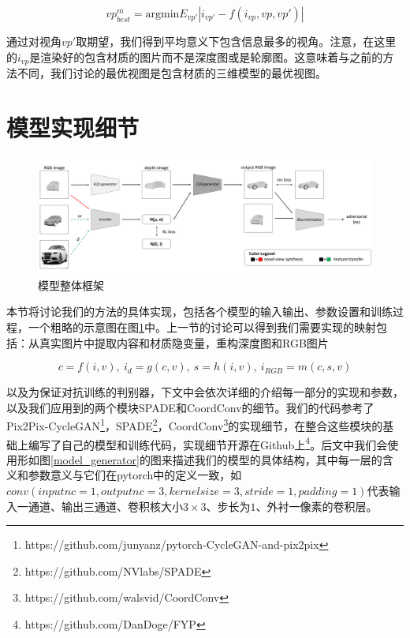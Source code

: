 \documentclass[UTF8,openany,AutoFakeBold,AutoFakeSlant,cs4size]{ctexbook}
\begin{document}
\begin{equation}
	vp_{best}^{m} = \mbox{argmin} E_{vp'} | i_{vp'} - f(i_{vp}, vp, vp')|
\end{equation}


通过对视角$vp'$取期望，我们得到平均意义下包含信息最多的视角。注意，在这里的$i_{vp}$是渲染好的包含材质的图片而不是深度图或是轮廓图。这意味着与之前的方法不同，我们讨论的最优视图是包含材质的三维模型的最优视图。

\section{模型实现细节}

\begin{figure}
\centering
\includegraphics[width=\linewidth]{./images/banner.png}
\caption{模型整体框架}
\label{model_architecture}
\end{figure}

本节将讨论我们的方法的具体实现，包括各个模型的输入输出、参数设置和训练过程，一个粗略的示意图在图\ref{model_architecture}中。上一节的讨论可以得到我们需要实现的映射包括：从真实图片中提取内容和材质隐变量，重构深度图和RGB图片

\begin{equation}
	c = f(i, v),\ i_d = g(c, v),\ s = h(i ,v),\ i_{RGB} = m(c, s, v)
\end{equation}

以及为保证对抗训练的判别器，下文中会依次详细的介绍每一部分的实现和参数，以及我们应用到的两个模块SPADE\cite{park2019SPADE}和CoordConv\cite{NIPS2018_8169}的细节。我们的代码参考了Pix2Pix-CycleGAN\footnote{https://github.com/junyanz/pytorch-CycleGAN-and-pix2pix}，SPADE\footnote{https://github.com/NVlabs/SPADE}，CoordConv\footnote{https://github.com/walsvid/CoordConv}的实现细节，在整合这些模块的基础上编写了自己的模型和训练代码，实现细节开源在Github上\footnote{https://github.com/DanDoge/FYP}。后文中我们会使用形如图\ref{model_generator}的图来描述我们的模型的具体结构，其中每一层的含义和参数意义与它们在pytorch\cite{NEURIPS2019_9015}中的定义一致，如$conv(inputnc=1, outputnc=3, kernelsize=3, stride=1, padding=1)$代表输入一通道、输出三通道、卷积核大小$3 \times 3$、步长为$1$、外衬一像素的卷积层。
\end{document}
